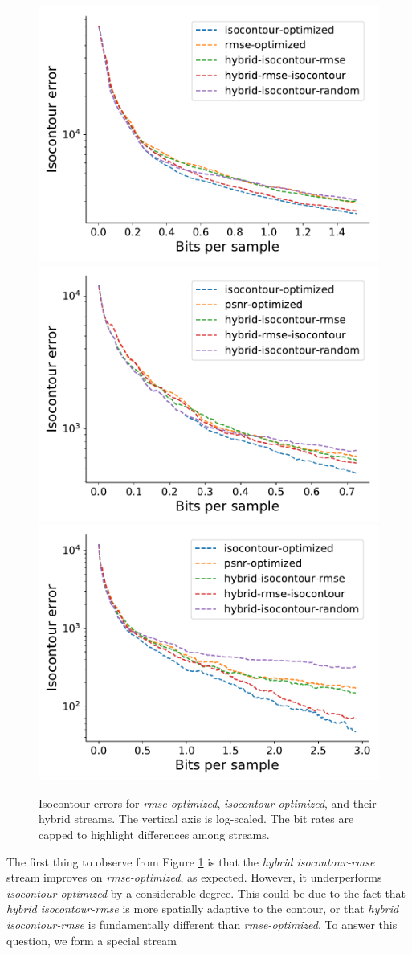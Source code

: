 \begin{figure}
	{\includegraphics[width=0.48\linewidth]{img/isocontour/pressure-isocontour-long.pdf}}
	{\includegraphics[width=0.48\linewidth]{img/isocontour/viscosity-isocontour.pdf}}
	{\includegraphics[width=0.48\linewidth]{img/isocontour/viscosity-isocontour-long.pdf}}
	\caption{Isocontour errors for \emph{rmse-optimized}, \emph{isocontour-optimized}, and their
	hybrid streams. The vertical axis is log-scaled. The bit rates are capped to highlight differences
	among streams.}
	\label{fig:isocontour-plots}
\end{figure}

The first thing to observe from Figure \ref{fig:isocontour-plots} is that the \emph{hybrid
isocontour-rmse} stream improves on \emph{rmse-optimized}, as expected. However, it underperforms
\emph{isocontour-optimized} by a considerable degree. This could be due to the fact that
\emph{hybrid isocontour-rmse} is more spatially adaptive to the contour, or that \emph{hybrid
isocontour-rmse} is fundamentally different than \emph{rmse-optimized}. To answer this question, we
form a special stream 

